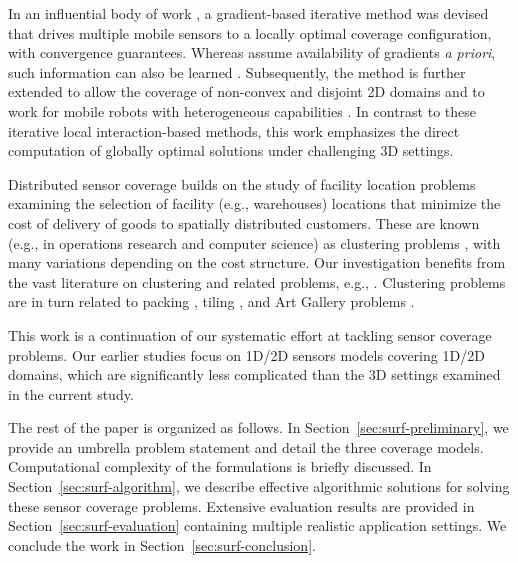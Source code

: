 In an influential body of work \cite{cortes2004coverage,martinez2007motion}, a gradient-based iterative method was devised that drives multiple mobile sensors to a locally optimal coverage configuration, with 
convergence guarantees. 
%
Whereas \cite{cortes2004coverage,martinez2007motion} assume availability of gradients {\em a priori}, such information can also be learned \cite{schwager2009decentralized}. 
%
Subsequently, the method is further extended to allow the coverage of non-convex and disjoint 2D domains \cite{schwager2009optimal} and to work for mobile robots with heterogeneous capabilities \cite{pierson2017adapting}. 
%
In contrast to these iterative local interaction-based methods, this work emphasizes the direct computation of globally optimal solutions under challenging 3D settings. 

Distributed sensor coverage \cite{cortes2004coverage,schwager2009decentralized} builds on the study of facility location problems \cite{weber1929theory,drezner1995facility} examining the selection of facility (e.g., warehouses) locations that minimize the cost of delivery of goods to spatially distributed customers. These are known (e.g., in operations research and computer science) as clustering problems \cite{har2011geometric}, with many variations depending on the cost structure. Our investigation benefits from the vast literature on clustering and related problems, e.g., \cite{feder1988optimal,hochbaum1985best,gonzalez1985clustering,daskin2000new,shamos1975closest}.
%
Clustering problems are in turn related to packing \cite{hales2005proof}, tiling \cite{thue1910dichteste}, and Art Gallery problems \cite{o1987art,shermer1992recent}.

This work is a continuation of our systematic effort \cite{fenghangaoyu2019efficient,fengyu2020RAL,fengyu2020optimally} at tackling sensor coverage problems. Our earlier studies focus on 1D/2D sensors models covering 1D/2D domains, which are significantly less complicated than the 3D settings examined in the current study.

The rest of the paper is organized as follows. In Section~\ref{sec:surf-preliminary}, we provide an umbrella problem statement and detail the three coverage models. Computational complexity of the formulations is briefly discussed. In Section~\ref{sec:surf-algorithm}, we describe effective algorithmic solutions for solving these sensor coverage problems. Extensive evaluation results are provided in Section~\ref{sec:surf-evaluation} containing multiple realistic application settings. We conclude the work in Section~\ref{sec:surf-conclusion}.
